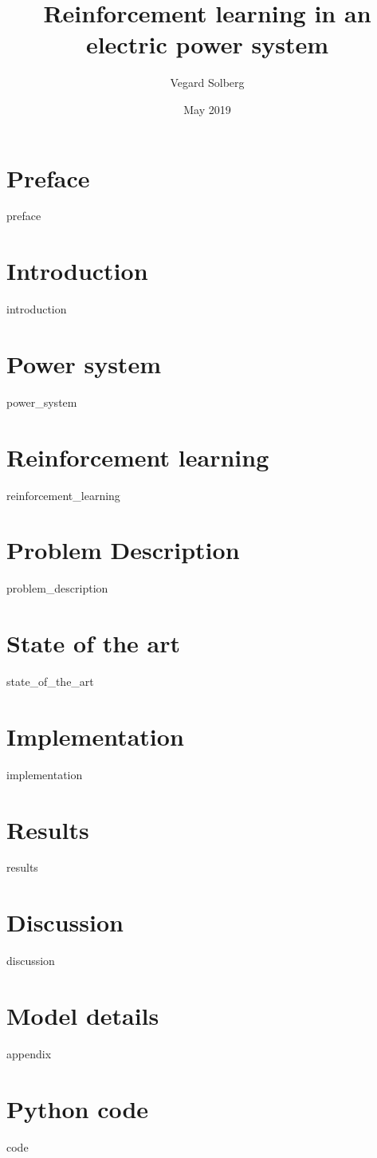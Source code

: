 \documentclass{book}
\title{Reinforcement learning in an electric power system}
\author{Vegard Solberg}
\date{May 2019}
\begin{document}
    \frontmatter
    \chapter{Preface}
    {preface}
    
    \tableofcontents
    
    \mainmatter
    \chapter{Introduction}
    {introduction}
    
    \chapter{Power system}
    {power_system}
 
    \chapter{Reinforcement learning}
    {reinforcement_learning}
    
    \chapter{Problem Description}\label{chap:prob_description}
    {problem_description}
    
    \chapter{State of the art}
    {state_of_the_art}
    
    \chapter{Implementation}
    {implementation}
    
    
    \chapter{Results}
    {results}
    
    \chapter{Discussion}
    {discussion}
    \printbibliography

    \appendix
    \chapter{Model details}
    {appendix}
    
    \chapter{Python code}
    {code}
    
\end{document}
